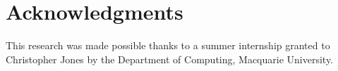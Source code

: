 \documentclass[11pt]{article}
\begin{document}
\section*{Acknowledgments}

This research was made possible thanks to a summer internship granted
to Christopher Jones by the Department of Computing, Macquarie
University.










\end{document}
